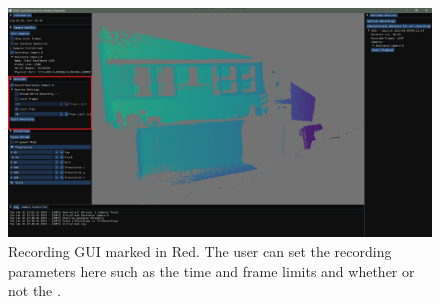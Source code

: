 \begin{figure}[ht]
  \centering
  \includegraphics[width=0.8\linewidth]{figures/FESD/recording_gui.png}
  \caption[Recording GUI marked in Red]{Recording GUI marked in Red. The user can set the recording parameters here such as the time and frame limits and whether or not the .}
  \label{fig:recording_gui}
\end{figure}